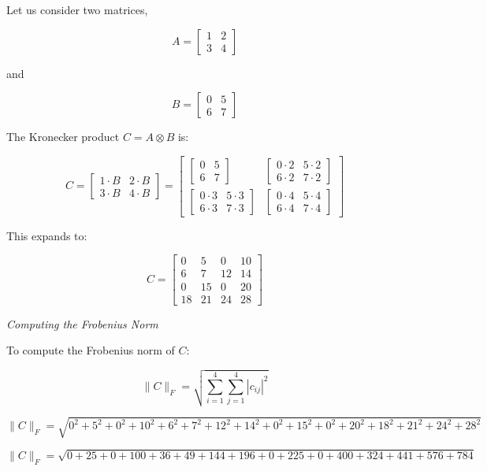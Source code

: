 \documentclass[
  letterpaper,
  DIV=11,
  numbers=noendperiod]{scrreprt}
\theoremstyle{plain}
\theoremstyle{definition}
\theoremstyle{remark}
\begin{document}
Let us consider two matrices,

\[A = \begin{bmatrix}1 & 2 \\3 & 4\end{bmatrix}\]

and

\[B = \begin{bmatrix}0 & 5 \\6 & 7\end{bmatrix}\]

The Kronecker product \(C = A \otimes B\) is:

\[C = \begin{bmatrix}1 \cdot B & 2 \cdot B \\3 \cdot B & 4 \cdot B\end{bmatrix}= \begin{bmatrix}\begin{bmatrix}0 & 5 \\6 & 7\end{bmatrix} & \begin{bmatrix}0 \cdot 2 & 5 \cdot 2 \\6 \cdot 2 & 7 \cdot 2\end{bmatrix} \\\begin{bmatrix}0 \cdot 3 & 5 \cdot 3 \\6 \cdot 3 & 7 \cdot 3\end{bmatrix} & \begin{bmatrix}0 \cdot 4 & 5 \cdot 4 \\6 \cdot 4 & 7 \cdot 4\end{bmatrix}\end{bmatrix}\]

This expands to:

\[C = \begin{bmatrix}0 & 5 & 0 & 10 \\6 & 7 & 12 & 14 \\0 & 15 & 0 & 20 \\18 & 21 & 24 & 28\end{bmatrix}\]

\emph{Computing the Frobenius Norm}

To compute the Frobenius norm of \(C\):

\[\|C\|_F = \sqrt{\sum_{i=1}^{4} \sum_{j=1}^{4} |c_{ij}|^2}\]

\[\|C\|_F = \sqrt{0^2 + 5^2 + 0^2 + 10^2 + 6^2 + 7^2 + 12^2 + 14^2 + 0^2 + 15^2 + 0^2 + 20^2 + 18^2 + 21^2 + 24^2 + 28^2}\]

\[\|C\|_F = \sqrt{0 + 25 + 0 + 100 + 36 + 49 + 144 + 196 + 0 + 225 + 0 + 400 + 324 + 441 + 576 + 784}\]
\end{document}
